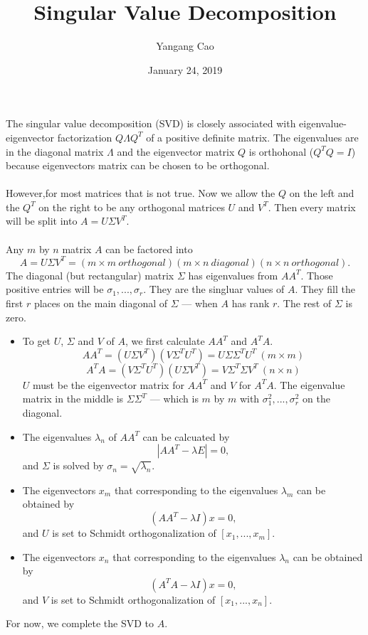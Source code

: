 \documentclass[10pt,a4paper,oneside]{article}
\author{Yangang Cao}
\date{January 24, 2019}
\begin{document}
\title{Singular Value Decomposition}
\maketitle
The singular value decomposition (SVD) is closely associated with eigenvalue-eigenvector factorization $Q\Lambda Q^{T}$ of a positive definite matrix. The eigenvalues are in the diagonal matrix $\Lambda$ and the eigenvector matrix $Q$ is orthohonal ($Q^{T}Q = I$) because eigenvectors matrix can be chosen to be orthogonal. \\\\
However,for most matrices that is not true. Now we allow the $Q$ on the left and the $Q^{T}$ on the right to be any orthogonal matrices $U$ and $V^{T}$. Then every matrix will be split into $A = U\Sigma V^{T}$.\\\\
Any $m$ by $n$ matrix $A$ can be factored into
\[
A = U\Sigma V^{T} = (m \times m\ orthogonal)(m \times n\ diagonal)(n \times n\ orthogonal).
\]
The diagonal (but rectangular) matrix $\Sigma$ has eigenvalues from $AA^{T}$. Those positive entries will be $\sigma_{1},...,\sigma_{r}$. They are the singluar values of $A$. They fill the first $r$ places on the main diagonal of $\Sigma$ --- when $A$ has rank $r$. The rest of $\Sigma$ is zero.
\begin{itemize}

\item To get $U$, $\Sigma$ and $V$ of $A$, we first calculate $AA^{T}$  and $A^{T}A$.
\[
AA^{T}= (U\Sigma V^{T})(V\Sigma^{T}U^{T}) = U\Sigma\Sigma^{T}U^{T}\ (m\times m)
\]
\[
A^{T}A=(V\Sigma^{T}U^{T}) (U\Sigma V^{T}) = V\Sigma^{T}\Sigma V^{T}\ (n\times n)
\]
$U$ must be the eigenvector matrix for $AA^{T}$ and $V$ for $A^{T}A$. The eigenvalue matrix in the middle is $\Sigma\Sigma^{T}$ --- which is $m$ by $m$ with $\sigma^{2}_{1},...,\sigma^{2}_{r}$ on the diagonal.
\item The eigenvalues $\lambda_{n}$ of $AA^{T}$ can be calcuated by
\[
\left|AA^{T} - \lambda E \right| = 0,
\]
and $\Sigma$ is solved by $\sigma_{n} = \sqrt{\lambda_{n}}$.
\item The eigenvectors $x_{m}$ that corresponding to the eigenvalues $\lambda_{m}$ can be obtained by
\[
(AA^{T} - \lambda I)x = 0,
\]
and $U$ is set to Schmidt orthogonalization of $[x_{1},...,x_{m}]$.
\item The eigenvectors $x_{n}$ that corresponding to the eigenvalues $\lambda_{n}$ can be obtained by
\[
(A^{T}A - \lambda I)x = 0,
\]
and $V$ is set to Schmidt orthogonalization of $[x_{1},...,x_{n}]$.
\end{itemize}
For now, we complete the SVD to $A$.
\end{document}
